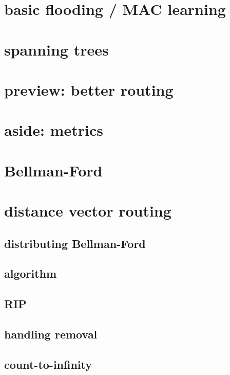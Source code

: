 \section{basic flooding / MAC learning}


\section{spanning trees}


\section{preview: better routing}


\section{aside: metrics}


\section{Bellman-Ford}


\section{distance vector routing}
\subsection{distributing Bellman-Ford}


\subsection{algorithm}


\subsection{RIP}


\subsection{handling removal}

\subsection{count-to-infinity}


